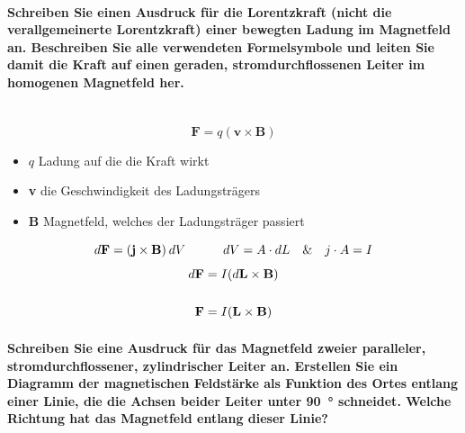 \documentclass[a4paper, 11pt, ngerman, parskip=half-]{scrartcl}
\begin{document}
\paragraph{Schreiben Sie einen Ausdruck für die Lorentzkraft (nicht die verallgemeinerte
    Lorentzkraft) einer bewegten Ladung im Magnetfeld an. Beschreiben Sie alle verwendeten Formelsymbole
    und leiten Sie damit die Kraft auf einen geraden, stromdurchflossenen Leiter im homogenen Magnetfeld
    her.}~\\
\begin{equation}
    \textbf{F} = q(\textbf{v} \times \textbf{B})
\end{equation}
\begin{itemize}
    \item $q$ Ladung auf die die Kraft wirkt
    \item \textbf{v} die Geschwindigkeit des Ladungsträgers
    \item \textbf{B} Magnetfeld, welches der Ladungsträger passiert
\end{itemize}
\begin{equation}
    d\textbf{F} = (\textbf{j} \times \textbf{B})\hspace{0.2em} dV \hspace{3em} dV = A\cdot dL \hspace{1em}\& \hspace{1em} j \cdot A = I
\end{equation}
\begin{align}
    d\textbf{F} & = I (d\textbf{L} \times \textbf{B}) \\
    \notag                                            \\
    \textbf{F}  & = I (\textbf{L} \times \textbf{B})
\end{align}
\paragraph{Schreiben Sie eine Ausdruck für das Magnetfeld zweier paralleler, stromdurchflossener,
    zylindrischer Leiter an. Erstellen Sie ein Diagramm der magnetischen Feldstärke als Funktion des
    Ortes entlang einer Linie, die die Achsen beider Leiter unter \SI{90}{\degree} schneidet. Welche
    Richtung hat das Magnetfeld entlang dieser Linie?}~\\
\end{document}
